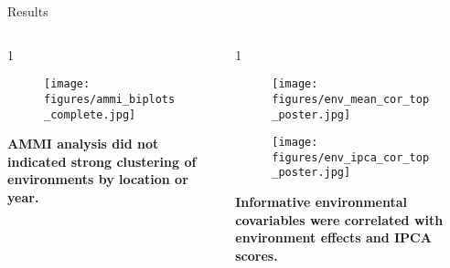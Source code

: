 \documentclass[final]{beamer}
\newlength{\onecolwid}
\newlength{\twocolwid}
\begin{document}
\begin{frame}[t]
\begin{columns}[t]
\begin{column}{\twocolwid}
\begin{block}{Results}
\begin{columns}[t,totalwidth=\twocolwid]
\begin{column}{1\onecolwid}
\begin{figure}
  \texttt{[image: figures/ammi\_biplots\_complete.jpg]}
\end{figure}

\vspace{0.5cm}

\begin{footnotesize}

\textbf{AMMI analysis did not indicated strong clustering of environments by location or year.}

\end{footnotesize}



\end{column} %


\begin{column}{1\onecolwid} %


\begin{figure}
  \begin{center}
  \begin{minipage}[m]{0.48\linewidth}
    \centering
    \texttt{[image: figures/env\_mean\_cor\_top\_poster.jpg]}
  \end{minipage}%
  \hspace{0.02\linewidth}
  \begin{minipage}[m]{0.48\linewidth}
    \centering
    \texttt{[image: figures/env\_ipca\_cor\_top\_poster.jpg]}
  \end{minipage}%
\end{center}
\end{figure}


\begin{footnotesize}

\textbf{Informative environmental covariables were correlated with environment effects and IPCA scores.}

\end{footnotesize}



\end{column} %



\end{columns} %




\vspace{3cm}




\end{block}
\end{column}
\end{columns}
\end{frame}
\end{document}

